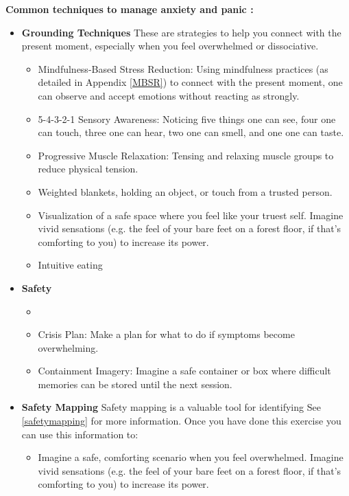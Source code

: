 \documentclass[12pt,letterpaper]{article}
\begin{document}
\noindent \textbf{Common techniques to manage anxiety and panic \cite{vanderKolkBody,williamsWorkbook}:}
\begin{itemize}
    \item \textbf{Grounding Techniques} These are strategies to help you connect with the present moment, especially when you feel overwhelmed or dissociative. 
    \begin{itemize}
        \item Mindfulness-Based Stress Reduction: Using mindfulness practices (as detailed in Appendix \ref{MBSR}) to connect with the present moment, one can observe and accept emotions without reacting as strongly.
        \item 5-4-3-2-1 Sensory Awareness: Noticing five things one can see, four one can touch, three one can hear, two one can smell, and one one can taste.
        \item Progressive Muscle Relaxation: Tensing and relaxing muscle groups to reduce physical tension.
        \item Weighted blankets, holding an object, or touch from a trusted person.
        \item Visualization of a safe space where you feel like your truest self. Imagine vivid sensations (e.g. the feel of your bare feet on a forest floor, if that's comforting to you) to increase its power.
        \item Intuitive eating
    \end{itemize}
    \item \textbf{Safety}
    \begin{itemize}
        \item {}
        \item Crisis Plan: Make a plan for what to do if symptoms become overwhelming. 
        \item Containment Imagery: Imagine a safe container or box where difficult memories can be stored until the next session.
    \end{itemize}
    \item \textbf{Safety Mapping} Safety mapping is a valuable tool for identifying See \ref{safetymapping} for more information. Once you have done this exercise you can use this information to:
    \begin{itemize}
        \item Imagine a safe, comforting scenario when you feel overwhelmed. Imagine vivid sensations (e.g. the feel of your bare feet on a forest floor, if that's comforting to you) to increase its power.

\end{itemize}
\end{itemize}
\end{document}
